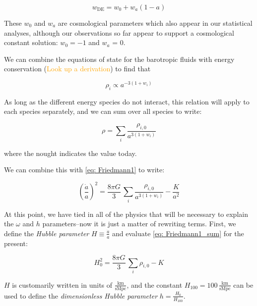 \begin{equation}
w_\text{DE} = w_0 + w_a (1 - a)
\end{equation}

These $w_0$ and $w_a$ are cosmological parameters which also appear in our
statistical analyses, although our observations so far appear to support
a cosmological constant solution: $w_0 = -1$ and $w_a$ = 0.

We can combine the equations of state for the barotropic fluids with energy 
conservation (\textcolor{orange}{Look up a derivation}) to find that

\begin{equation}
\rho_i \propto a^{-3 (1 + w_i)}
\end{equation}

As long as the different energy species do not interact, this relation will
apply to each species separately, and we can sum over all species to write:

\begin{equation}
\rho = \sum_i \frac{\rho_{i, 0}}{a^{3(1 + w_i)}}
\end{equation}

where the nought indicates the value today.

We can combine this with \ref{eq: Friedmann1} to write:

\begin{equation}
\label{eq: Friedmann1_sum}
\left( \frac{\dot{a}}{a} \right)^2
=
\frac{8 \pi G}{3} \, \sum_i \frac{\rho_{i, 0}}{a^{3(1 + w_i)}} - \frac{K}{a^2}
\end{equation}


At this point, we have tied in all of the physics that will be necessary to
explain the $\omega$ and $h$ parameters--now it is just a matter of rewriting 
terms. First, we define the \textit{Hubble parameter}
$H \equiv \frac{\dot{a}}{a}$ and evaluate \ref{eq: Friedmann1_sum}
for the present:

\begin{equation}
\label{eq: Friedmann1_present}
H_0^2 = \frac{8 \pi G}{3} \, \sum_i \rho_{i, 0} - K
\end{equation}

$H$ is customarily written in units of
$\frac{\mathrm{km}}{\mathrm{s} \mathrm{Mpc}}$, and the constant
$H_{100} = 100 \, \frac{\mathrm{km}}{\mathrm{s} \mathrm{Mpc}}$ can be used to
define the \textit{dimensionless Hubble parameter} $h = \frac{H_0}{H_{100}}$.

